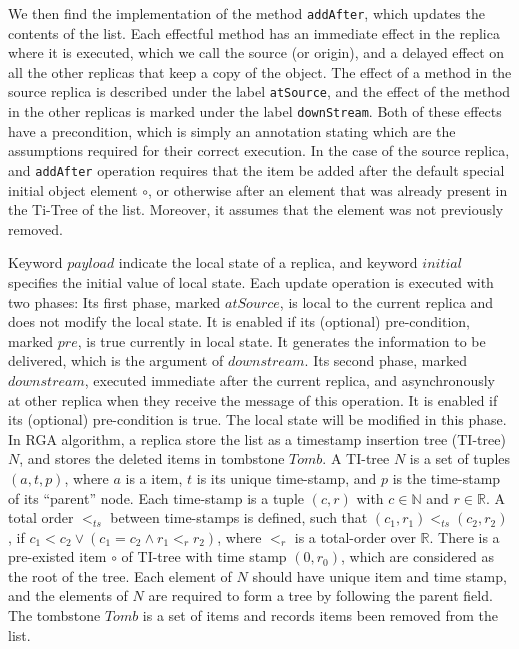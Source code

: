 We then find the implementation of the method \lstinline|addAfter|,
which updates the contents of the list.
%
Each effectful method has an immediate effect in the replica where it
is executed, which we call the source (or origin), and a delayed
effect on all the other replicas that keep a copy of the object.
%
The effect of a method in the source replica is described under the
label \lstinline|atSource|, and the effect of the method in the other
replicas is marked under the label \lstinline|downStream|.
%
Both of these effects have a precondition, which is simply an
annotation stating which are the assumptions required for their
correct execution.
%
In the case of the source replica, and \lstinline|addAfter| operation
requires that the item be added after the default special initial
object element $\circ$, or otherwise after an element that was
already present in the Ti-Tree of the list.
%
Moreover, it assumes that the element was not previously removed.




Keyword $\mathit{payload}$ indicate the local state of a replica, and
keyword $\mathit{initial}$ specifies the initial value of local state.
Each update operation is executed with two phases: Its first phase, marked $\mathit{atSource}$, is local to the current replica and does not modify the local state. It is enabled if its (optional) pre-condition, marked $\mathit{pre}$, is true currently in local state. It generates the information to be delivered, which is the argument of $\mathit{downstream}$. Its second phase, marked $\mathit{downstream}$, executed immediate after the current replica, and asynchronously at other replica when they receive the message of this operation. It is enabled if its (optional) pre-condition is true. The local state will be modified in this phase.
In RGA algorithm, a replica store the list as a timestamp insertion tree (TI-tree) $N$, and stores the deleted items in tombstone $\mathit{Tomb}$. A TI-tree $N$ is a set of tuples $(a,t,p)$, where $a$ is a item, $t$ is its unique time-stamp, and $p$ is the time-stamp of its ``parent'' node. Each time-stamp is a tuple $(c,r)$ with $c \in \mathbb{N}$ and $r \in \mathbb{R}$. A total order $<_{\mathit{ts}}$ between time-stamps is defined, such that $(c_1,r_1) <_{\mathit{ts}} (c_2,r_2)$, if $c_1 < c_2 \vee (c_1 = c_2 \wedge r_1 <_r r_2)$, where $<_r$ is a total-order over $\mathbb{R}$. There is a pre-existed item $\circ$ of TI-tree with time stamp $(0,r_0)$, which are considered as the root of the tree. Each element of $N$ should have unique item and time stamp, and the elements of $N$ are required to form a tree by following the parent field. The tombstone $\mathit{Tomb}$ is a set of items and records items been removed from the list.

